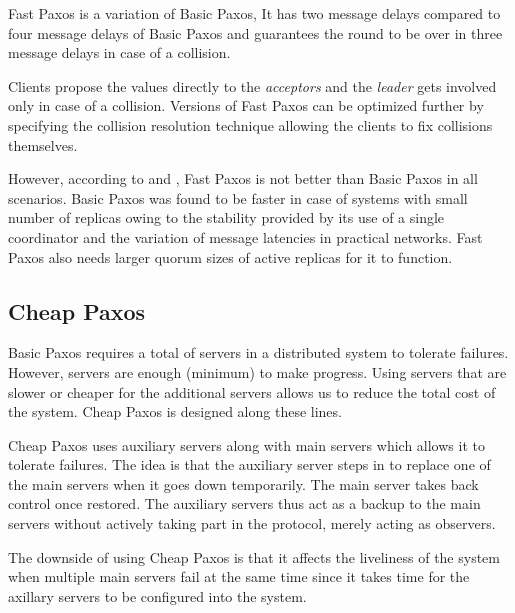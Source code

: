 Fast Paxos \citep{MSRTR2005112} is a variation of Basic Paxos, It has two
message delays compared to four message delays of Basic Paxos and guarantees
the round to be over in three message delays in case of a collision.

Clients propose the values directly to the \emph{acceptors} and the
\emph{leader} gets involved only in case of a collision. Versions of Fast
Paxos can be optimized further by specifying the collision
resolution technique allowing the clients to fix collisions themselves.

However, according to \citet{Vieira08theperformance} and \citet{Junqueira2007},
Fast Paxos is not better than Basic Paxos in all scenarios. Basic Paxos was
found to be faster in case of systems with small number of replicas%
owing to
the stability provided by its use of a single coordinator%
 and the variation
of message latencies in practical networks. Fast Paxos also needs larger quorum
sizes of active replicas for it to function.

\subsection{Cheap Paxos}

Basic Paxos requires a total of  servers in a distributed system to
tolerate  failures. However,  servers are enough (minimum) to
make progress.
Using servers that are slower or cheaper for the additional  servers
allows us to reduce the total cost of the system. Cheap Paxos \citep{LamportM04}
is designed along these lines.

Cheap Paxos uses  auxiliary servers along with  main servers
which allows it to tolerate  failures. The idea is that the auxiliary
server steps in to replace one of the main servers when it goes down
temporarily. The main server takes back control once restored. The auxiliary
servers thus act as a backup to the main servers without actively taking part
in the protocol, merely acting as observers.

The downside of using Cheap Paxos is that it affects the liveliness of the
system when multiple main servers fail at the same time since it takes time
for the axillary servers to be configured into the system.

